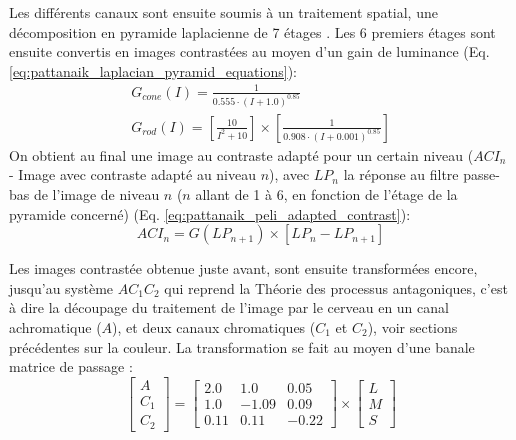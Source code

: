 	\par Les différents canaux sont ensuite soumis à un traitement spatial, une décomposition en pyramide laplacienne de 7 étages \citep{burt_laplacian_1983}. Les 6 premiers étages sont ensuite convertis en images contrastées \citep{peli_contrast_1990} au moyen d'un gain de luminance (Eq. \ref{eq:pattanaik_laplacian_pyramid_equations}):
	\begin{equation}
		\begin{array}{c}
		G_{cone}(I) = \frac{1}{0.555 \cdot (I+1.0)^{0.85}}\\
		G_{rod}(I) = \left[ \frac{10}{I^2+10} \right] \times \left[ \frac{1}{0.908 \cdot (I+0.001)^{0.85}} \right]
		\end{array}
		\label{eq:pattanaik_laplacian_pyramid_equations}
	\end{equation}
	On obtient au final une image au contraste adapté pour un certain niveau ($ACI_n$ - Image avec contraste adapté au niveau $n$), avec $LP_n$ la réponse au filtre passe-bas de l'image de niveau $n$ ($n$ allant de 1 à 6, en fonction de l'étage de la pyramide concerné) (Eq. \ref{eq:pattanaik_peli_adapted_contrast}):
	\begin{equation}
		ACI_n = G(LP_{n+1}) \times \left[ LP_n - LP_{n+1} \right]
		\label{eq:pattanaik_peli_adapted_contrast}
	\end{equation}
	
	\par Les images contrastée obtenue juste avant, sont ensuite transformées encore, jusqu'au système $AC_1C_2$ qui reprend la Théorie des processus antagoniques, c'est à dire la découpage du traitement de l'image par le cerveau en un canal achromatique ($A$), et deux canaux chromatiques ($C_1$ et $C_2$), voir sections précédentes sur la couleur. La transformation se fait au moyen d'une banale matrice de passage \citep{hunt_reproduction_1995,fairchild_color_1998}:
	\begin{equation}
		\left[ \begin{array}{c}A\\ C_1\\ C_2\end{array} \right] = \left[ \begin{array}{ccc}
		2.0 & 1.0 & 0.05\\
		1.0 & -1.09 & 0.09\\
		0.11 & 0.11 & -0.22		
		\end{array} \right] \times \left[ \begin{array}{c}L\\ M\\ S\end{array} \right]
		\label{eq:pattanaik_linear_transform_lms_to_ac1c2}
	\end{equation}
	
